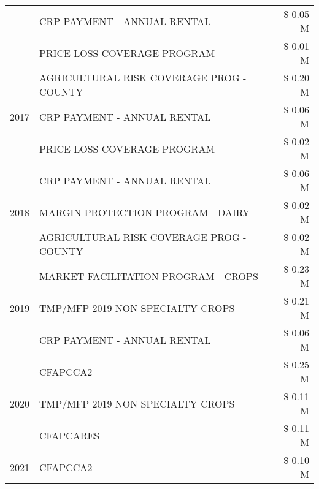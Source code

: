 \begin{tabular}{llr}
 & CRP PAYMENT - ANNUAL RENTAL & \$ 0.05 M \\
 & PRICE LOSS COVERAGE PROGRAM & \$ 0.01 M \\
\cline{1-3}
\multirow[t]{3}{*}{2017} & AGRICULTURAL RISK COVERAGE PROG - COUNTY & \$ 0.20 M \\
 & CRP PAYMENT - ANNUAL RENTAL & \$ 0.06 M \\
 & PRICE LOSS COVERAGE PROGRAM & \$ 0.02 M \\
\cline{1-3}
\multirow[t]{3}{*}{2018} & CRP PAYMENT - ANNUAL RENTAL & \$ 0.06 M \\
 & MARGIN PROTECTION PROGRAM - DAIRY & \$ 0.02 M \\
 & AGRICULTURAL RISK COVERAGE PROG - COUNTY & \$ 0.02 M \\
\cline{1-3}
\multirow[t]{3}{*}{2019} & MARKET FACILITATION PROGRAM - CROPS & \$ 0.23 M \\
 & TMP/MFP 2019 NON SPECIALTY CROPS & \$ 0.21 M \\
 & CRP PAYMENT - ANNUAL RENTAL & \$ 0.06 M \\
\cline{1-3}
\multirow[t]{3}{*}{2020} & CFAPCCA2 & \$ 0.25 M \\
 & TMP/MFP 2019 NON SPECIALTY CROPS & \$ 0.11 M \\
 & CFAPCARES & \$ 0.11 M \\
\cline{1-3}
2021 & CFAPCCA2 & \$ 0.10 M \\
\cline{1-3}
\bottomrule
\end{tabular}
